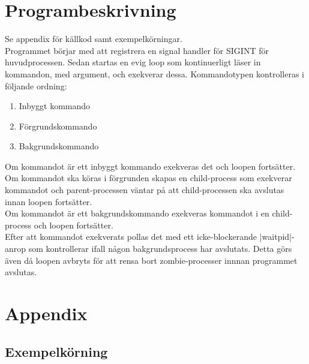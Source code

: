 \documentclass[paper=a4, fontsize=11pt]{scrartcl} %
\numberwithin{equation}{section} %
\numberwithin{figure}{section} %
\numberwithin{table}{section} %
\begin{document}
\section{Programbeskrivning}

Se appendix för källkod samt exempelkörningar.\\

Programmet börjar med att registrera en signal handler för SIGINT för huvudprocessen.
Sedan startas en evig loop som kontinuerligt läser in kommandon, med argument, och exekverar dessa.
Kommandotypen kontrolleras i följande ordning:
\begin{enumerate}
\item{Inbyggt kommando}
\item{Förgrundskommando}
\item{Bakgrundskommando}
\end{enumerate}

Om kommandot är ett inbyggt kommando exekveras det och loopen fortsätter.\\
Om kommandot ska köras i förgrunden skapas en child-process som exekverar kommandot
och parent-processen väntar på att child-processen ska avslutas innan loopen fortsätter.\\
Om kommandot är ett bakgrundskommando exekveras kommandot i en child-process och loopen fortsätter.\\

Efter att kommandot exekverats pollas det med ett icke-blockerande |waitpid|-anrop som kontrollerar ifall
någon bakgrundsprocess har avslutats. Detta görs även då loopen avbryts för att rensa bort zombie-processer innnan programmet avslutas.




\newpage
\section*{Appendix}
\subsection*{Exempelkörning}
\end{document}
